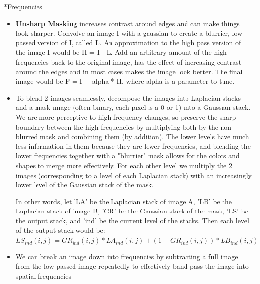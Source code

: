 \documentclass[3pt,landscape]{article}
\makeatletter
\renewcommand{\subsection}{\@startsection{subsection}{2}{0mm}{-1explus -.5ex minus -.2ex}{0.5ex plus .2ex}{\normalfont\normalsize\bfseries}}
\makeatother
\begin{document}
\begin{multicols}{3}
\subsection*{Frequencies}
\begin{itemize}
\item \textbf{Unsharp Masking} increases contrast around edges and can make things look sharper. Convolve an image I with a gaussian to create a blurrier, low-passed version of I, called L. An approximation to the high pass version of the image I would be H = I - L. Add an arbitrary amount of the high frequencies back to the original image, has the effect of increasing contrast around the edges and in most cases makes the image look better. The final image would be F = I + alpha * H, where alpha is a parameter to tune.

\item To blend 2 images seamlessly, decompose the images into Laplacian stacks and a mask image (often binary, each pixel is a 0 or 1) into a Gaussian stack. We are more perceptive to high frequency changes, so preserve the sharp boundary between the high-frequencies by multiplying both by the non-blurred mask and combining them (by addition). The lower levels have much less information in them because they are lower frequencies, and blending the lower frequencies together with a "blurrier" mask allows for the colors and shapes to merge more effectively. For each other level we multiply the 2 images (corresponding to a level of each Laplacian stack) with an increasingly lower level of the Gaussian stack of the mask.

In other words, let 'LA' be the Laplacian stack of image A, 'LB' be the Laplacian stack of image B, 'GR' be the Gaussian stack of the mask, 'LS' be the output stack, and 'ind' be the current level of the stacks. Then each level of the output stack would be:
$LS_{ind} (i, j) = GR_{ind} (i, j) * LA_{ind} (i, j) + (1 - GR_{ind} (i, j)) * LB_{ind} (i, j)$
\item We can break an image down into frequencies by subtracting a full image from the low-passed image repeatedly to effectively band-pass the image into spatial frequencies
\end{itemize}


\end{multicols}
\end{document}
